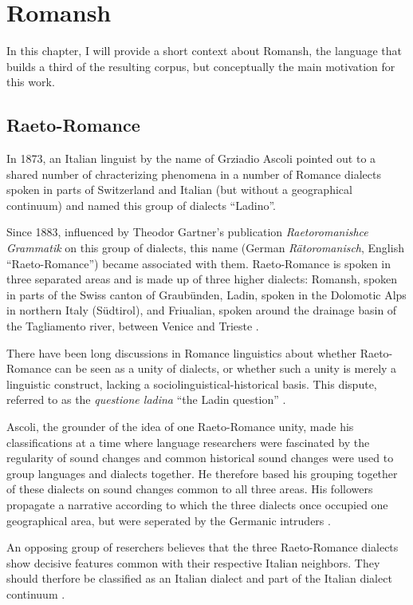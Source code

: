 \chapter{Romansh}

In this chapter, I will provide a short context about Romansh, the language that builds a third of the resulting corpus, but conceptually the main motivation for this work.

\section{Raeto-Romance}
In 1873, an Italian linguist by the name of Grziadio Ascoli pointed out to a shared number of chracterizing phenomena in a number of Romance dialects spoken in parts of Switzerland and Italian (but without a geographical continuum) and named this group of dialects \enquote{Ladino}. 

Since 1883, influenced by Theodor Gartner's publication \emph{Raetoromanishce Grammatik} on this group of dialects, this name (German \emph{Rätoromanisch}, English \enquote{Raeto-Romance}) became associated with them. 
Raeto-Romance is spoken in three separated areas and is made up of three higher dialects: Romansh, spoken in parts of the Swiss canton of Graubünden, Ladin, spoken in the Dolomotic Alps in northern Italy (Südtirol), and Friualian, spoken around the drainage basin of the Tagliamento river, between Venice and Trieste \autocite[1]{haiman1992}.

There have been long discussions in Romance linguistics about whether Raeto-Romance can be seen as a unity of dialects, or whether such a unity is merely a linguistic construct, lacking a sociolinguistical-historical basis. 
This dispute, referred to as the \emph{questione ladina} \enquote{the Ladin question} \autocite{liver1999}. 

Ascoli, the grounder of the idea of one Raeto-Romance unity, made his classifications at a time where language researchers were fascinated by the regularity of sound changes and common historical sound changes were used to group languages and dialects together. He therefore based his grouping together of these dialects on sound changes common to all three areas. 
His followers propagate a narrative according to which the three dialects once occupied one geographical area, but were seperated by the Germanic intruders \autocite[174]{bossong2008}.

An opposing group of reserchers believes that the three Raeto-Romance dialects show decisive  features common with their respective Italian neighbors. 
They should therfore be classified as an Italian dialect and part of the Italian dialect continuum \autocite[174]{bossong2008}.

